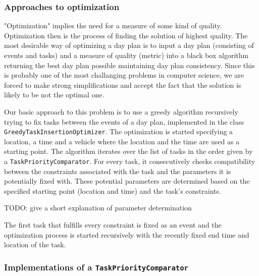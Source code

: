 \subsubsection{Approaches to optimization}
 
"Optimization" implies the need for a measure of some kind of quality. Optimization then is the process of finding the solution of highest quality. The most desirable way of optimizing a day plan is to input a day plan (consisting of events and tasks) and a measure of quality (metric) into a black box algorithm returning the best day plan possible maintaining day plan consistency. Since this is probably one of the most challanging problems in computer science, we are forced to make strong simplifications and accept the fact that the solution is likely to be not the optimal one.\newline

Our basic approach to this problem is to use a greedy algorithm recursively trying to fix tasks between the events of a day plan, implemented in the class \texttt{GreedyTaskInsertionOptimizer}. The optimization is started specifying a location, a time and a vehicle where the location and the time are used as a starting point. The algorithm iterates over the list of tasks in the order given by a \texttt{TaskPriorityComparator}. For every task, it consecutively checks compatibility between the constraints associated with the task and the parameters it is potentially fixed with. These potential parameters are determined based on the specified starting point (location and time) and the task's constraints.\newline

TODO: give a short explanation of parameter determination\newline

The first task that fulfills every constraint is fixed as an event and the optimization process is started recursively with the recently fixed end time and location of the task.

\subsubsection{Implementations of a \texttt{TaskPriorityComparator}}

